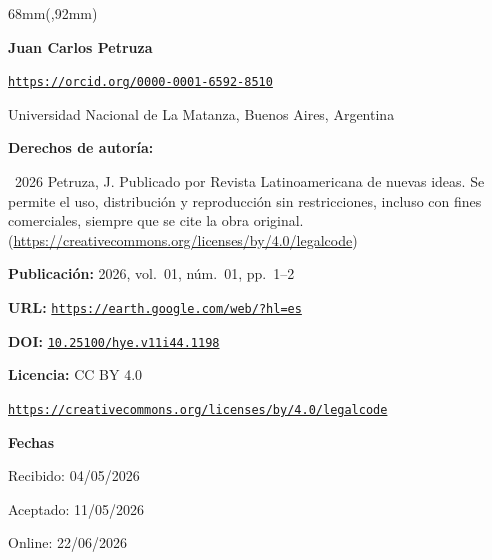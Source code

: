 \begin{textblock*}{68mm}(\gbbloquex,92mm)
{\setlength{\leftskip}{0pt}\setlength{\parindent}{0pt}%
\noindent\begin{minipage}[t]{68mm}
\sffamily\small\setlength{\parskip}{1pt}
{\bfseries\color{azulrevista}Juan Carlos Petruza}\par
{\scriptsize\texttt{\href{https://orcid.org/0000-0001-6592-8510}{https://orcid.org/0000-0001-6592-8510}}}\par
Universidad Nacional de La Matanza, Buenos Aires, Argentina\par
\vspace{6pt}
{\bfseries\color{azulrevista!70}Derechos de autor\'ia:}\par
\textcopyright\ 2026 Petruza, J. Publicado por Revista Latinoamericana de nuevas ideas. Se permite el uso, distribución y reproducción sin restricciones, incluso con fines comerciales, siempre que se cite la obra original. (\href{https://creativecommons.org/licenses/by/4.0/legalcode}{https://creativecommons.org/licenses/by/4.0/legalcode})\par\vspace{6pt}
{\bfseries\color{azulrevista!70}Publicación:} 2026, vol.~01, n\'um.~01, pp.~1--2\par\vspace{6pt}
{\bfseries\color{azulrevista!70}URL:} {\scriptsize\texttt{\href{https://earth.google.com/web/?hl=es}{https://earth.google.com/web/?hl=es}}}\par\vspace{6pt}
{\bfseries\color{azulrevista!70}DOI:} {\scriptsize\texttt{\href{https://doi.org/10.25100/hye.v11i44.1198}{10.25100/hye.v11i44.1198}}}\par\vspace{6pt}
{\bfseries\color{azulrevista!70}Licencia:} CC BY 4.0\par
{\scriptsize\texttt{\href{https://creativecommons.org/licenses/by/4.0/legalcode}{https://creativecommons.org/licenses/by/4.0/legalcode}}}\par
\vspace{6pt}
{\bfseries\color{azulrevista!70}Fechas}\par\vspace{2pt}
Recibido: 04/05/2026\par
Aceptado: 11/05/2026\par
Online: 22/06/2026\par
\vspace{6pt}
\vspace{6pt}

\end{minipage}}
\end{textblock*}
